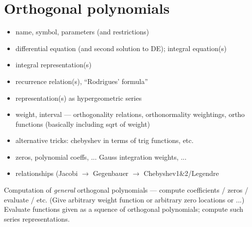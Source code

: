 \documentclass[10pt,dvipdfmx,letterpaper,twoside]{article}
\let\al=\alpha
\begin{document}
\section{Orthogonal polynomials}
\begin{itemize}
\item name, symbol, parameters (and restrictions)
\item differential equation (and second solution to DE); integral equation(s)
\item integral representation(s)
\item recurrence relation(s), ``Rodrigues' formula''
\item representation(s) as hypergeometric series
\item weight, interval --- orthogonality relations, orthonormality weightings,
  ortho functions (basically including sqrt of weight)
\item alternative tricks: chebyshev in terms of trig functions, etc.
\item zeros, polynomial coeffs, ... Gauss integration weights, ...
\item relationships (Jacobi $\to$ Gegenbauer $\to$ Chebyshev1\&2/Legendre
\end{itemize}
Computation of {\em general} orthogonal polynomials --- compute coefficients / zeros / evaluate / etc.
(Give arbitrary weight function or arbitrary zero locations or ...)
Evaluate functions given as a squence of orthogonal polynomials; compute such series representations.
\end{document}
